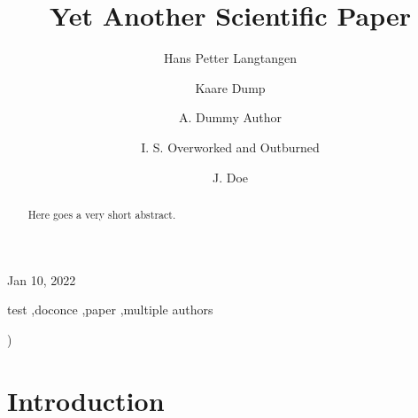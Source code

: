 \documentclass[final]{elsarticle}
\begin{document}

\newcommand{\exercisesection}[1]{\subsection*{#1}}








\begin{frontmatter}

\title{Yet Another Scientific Paper}


\author[inst1,inst2]{Hans Petter Langtangen}
\author[inst3]{Kaare Dump}
\author[]{A. Dummy Author}
\author[inst4,inst5,inst6,inst7]{I. S. Overworked and Outburned}
\author[]{J. Doe}\address[inst1]{Center for Biomedical Computing, Simula Research Laboratory}
\address[inst2]{Department of Informatics, University of Oslo}
\address[inst3]{Segfault, Cyberspace}
\address[inst4]{Inst1}
\address[inst5]{Inst2, Somewhere}
\address[inst6]{Third Inst, Elsewhere}
\address[inst7]{Fourth Inst}


\begin{center}
Jan 10, 2022
\end{center}

\vspace{1cm}

\begin{abstract}
Here goes
a very short
abstract.
\end{abstract}


\begin{keyword}
test \sep doconce \sep paper \sep multiple authors
\end{keyword}

\end{frontmatter}

)


\vspace{1cm} %

\section{Introduction}
\end{document}

